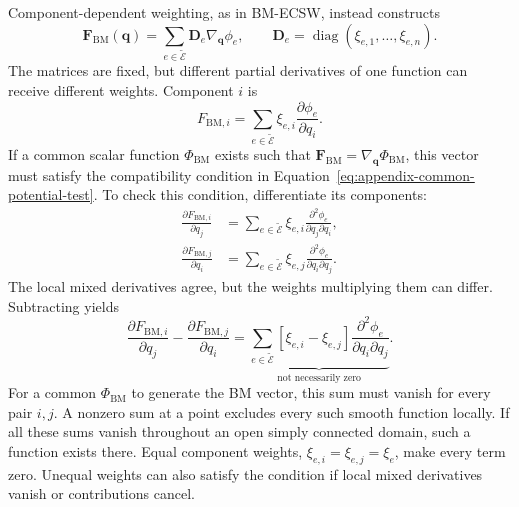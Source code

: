 \documentclass[a4paper,12pt]{article}
\newcommand{\vect}[1]{\boldsymbol{#1}}
\newcommand{\matr}[1]{\boldsymbol{#1}}
\begin{document}
Component-dependent weighting, as in BM-ECSW, instead constructs
\begin{equation}
 \vect{F}_{\mathrm{BM}}(\vect{q})
 =\sum_{e\in\widetilde{\mathcal E}}\matr{D}_e\nabla_{\vect{q}}\phi_e,
 \qquad
 \matr{D}_e=\operatorname{diag}(\xi_{e,1},\ldots,\xi_{e,n}).
 \label{eq:appendix-general-bm-vector}
\end{equation}
The matrices are fixed, but different partial derivatives of one function can receive different weights. Component $i$ is
\begin{equation}
 F_{\mathrm{BM},i}
 =\sum_{e\in\widetilde{\mathcal E}}\xi_{e,i}
       \frac{\partial \phi_e}{\partial q_i}.
 \label{eq:appendix-general-bm-component}
\end{equation}
If a common scalar function $\Phi_{\mathrm{BM}}$ exists such that $\vect{F}_{\mathrm{BM}}=\nabla_{\vect{q}}\Phi_{\mathrm{BM}}$, this vector must satisfy the compatibility condition in Equation~\eqref{eq:appendix-common-potential-test}. To check this condition, differentiate its components:
\begin{equation}
 \begin{aligned}
 \frac{\partial F_{\mathrm{BM},i}}{\partial q_j}
 &=\sum_{e\in\widetilde{\mathcal E}}\xi_{e,i}
       \frac{\partial^2\phi_e}{\partial q_j\partial q_i},\\
 \frac{\partial F_{\mathrm{BM},j}}{\partial q_i}
 &=\sum_{e\in\widetilde{\mathcal E}}\xi_{e,j}
       \frac{\partial^2\phi_e}{\partial q_i\partial q_j}.
 \end{aligned}
 \label{eq:appendix-bm-cross-derivatives}
\end{equation}
The local mixed derivatives agree, but the weights multiplying them can differ. Subtracting yields
\begin{equation}
 \frac{\partial F_{\mathrm{BM},i}}{\partial q_j}
 -\frac{\partial F_{\mathrm{BM},j}}{\partial q_i}
 =\underbrace{
   \sum_{e\in\widetilde{\mathcal E}}[\xi_{e,i}-\xi_{e,j}]
       \frac{\partial^2\phi_e}{\partial q_i\partial q_j}
   }_{\text{not necessarily zero}}.
 \label{eq:appendix-modal-compatibility}
\end{equation}
For a common $\Phi_{\mathrm{BM}}$ to generate the BM vector, this sum must vanish for every pair $i,j$. A nonzero sum at a point excludes every such smooth function locally. If all these sums vanish throughout an open simply connected domain, such a function exists there. Equal component weights, $\xi_{e,i}=\xi_{e,j}=\xi_e$, make every term zero. Unequal weights can also satisfy the condition if local mixed derivatives vanish or contributions cancel.
\end{document}

